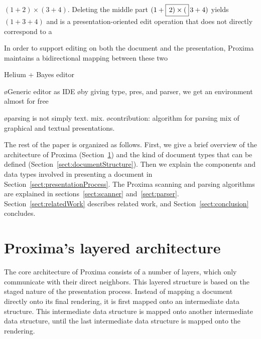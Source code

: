 \documentclass[12pt]{article}
\begin{document}
$(1+2) \times (3+4)$. Deleting the middle part $(1+\framebox{$\,2) \times ($}\,3+4)$ yields $(1+3+4)$ and is a presentation-oriented edit operation that does not directly correspond to a 

In order to support editing on both the document and the presentation, Proxima maintains a bidirectional mapping between these two

Helium + Bayes editor


\bl
\o Generic editor as IDE
\o by giving type, pres, and parser, we get an environment almost for free
\el

\bl
\o parsing is not simply text. mix.
\o contribution: algorithm for parsing mix of graphical and textual presentations.
\el

The rest of the paper is organized as follows. First, we give a brief overview of the architecture of Proxima (Section~\ref{sect:architecture}) and the kind of document types that can be defined (Section~\ref{sect:documentStructure}). Then we explain the components and data types involved in presenting a document in Section~\ref{sect:presentationProcess}. The Proxima scanning and parsing algorithms are explained in sections~\ref{sect:scanner} and~\ref{sect:parser}. Section~\ref{sect:relatedWork} describes related work, and Section~\ref{sect:conclusion} concludes.






%
\section{Proxima's layered architecture} \label{sect:architecture}
%

The core architecture of Proxima consists of a number of layers, which only communicate with their direct neighbors. This layered structure is based on the staged nature of the presentation process. Instead of mapping a document directly onto its final rendering, it is first mapped onto an intermediate data structure. This intermediate data structure is mapped onto another intermediate data structure, until the last intermediate data structure is mapped onto the rendering.
\end{document}
